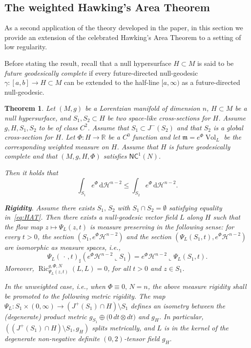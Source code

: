 \documentclass[12pt,a4paper]{amsart}
\theoremstyle{plain}
\newtheorem{theorem}[lemma]{Theorem}
\theoremstyle{definition}
\numberwithin{equation}{section}
\newcommand{\R}{\mathbb{R}}
\DeclareMathOperator{\Ric}{Ric}
\DeclareMathOperator{\vol}{Vol}
\newcommand{\de}{{\mathrm{d}}}
\newcommand{\NC}{\mathsf{NC}}
\newcommand{\haus}{\mathcal{H}}
\newcommand{\dotargument}{\,\cdot\,}
\newcommand{\mm}{\mathfrak m}
\begin{document}
\subsection{The weighted Hawking's Area Theorem}
\label{SS:WHAT}

As a second application of the theory
developed in the paper, in this section we provide an extension of  the celebrated Hawking's Area Theorem to a setting of low regularity.



Before stating the result, recall that a null hypersurface $H\subset M$ is said to be \emph{future geodesically complete} if every future-directed null-geodesic $\gamma:[a,b]\to H\subset M$ can be extended to the half-line $[a,\infty)$ as a future-directed null-geodesic.


\begin{theorem}\label{Thm:WHAT}
Let $(M,g)$ be a Lorentzian manifold of dimension $n$,
$H\subset M$ be a null hypersurface, and  $S_1,S_2\subset H$ be two space-like cross-sections for $H$. Assume $g, H, S_1, S_2$ to be of class $C^2$. Assume that $S_1\subset J^{-}(S_2)$ and that $S_2$ is a global
  cross-section for $H$.
Let $\Phi: H\to \R$ be a $C^0$ function and let $\mm=e^{\Phi} \vol_L$ be the corresponding weighted measure on $H$.
  Assume that $H$ is future geodesically complete and that  $(M,g,H, \Phi)$ satisfies
  $\NC^1(N)$. 
  
  Then it holds that
  \begin{equation}\label{eq:HAT}
    \int_{S_{1}}
    e^{\Phi}
    \,
    \de \haus^{n-2}
    \leq
    \int_{S_{2}}
    e^{\Phi}
    \,
    \de \haus^{n-2}
    .
  \end{equation}


\textbf{Rigidity}. Assume there exists $S_1,\,S_2$ with $S_1\cap S_2=\emptyset$ satisfying equality in~\eqref{eq:HAT}. Then there exists a null-geodesic vector field $L$ along $H$ such that the flow map $z\mapsto \Psi_{L}(z, t)$ is measure preserving in the following sense: for every $t>0$, the section $(S_1, e^{\Phi}\haus^{n-2})$ and the section $(\Psi_L(S_1, t), e^{\Phi}\haus^{n-2})$ are isomorphic as measure spaces, i.e., 
$$\Psi_L(\dotargument, t)_\sharp(e^{\Phi}\haus^{n-2}\llcorner S_1)= e^{\Phi}\haus^{n-2}\llcorner \Psi_L(S_1, t).$$ 
Moreover, $\Ric^{g,\Phi,N}_{\Psi_L(z,t)}(L,L) = 0$, for all $t>0$ and $z\in S_1$.


In the \emph{unweighted} case, i.e., when $\Phi\equiv 0, \, N=n$, the above measure rigidity shall be promoted to the following metric rigidity. The map $\Psi_L:S_1\times (0,\infty)\to (J^+(S_1)\cap H)\setminus S_1$ defines an isometry between the (degenerate) product  metric $g_{S_1}\oplus \big( 0 \, dt\otimes dt \big)$ and $g_H$. In particular, $((J^+(S_1)\cap H)\setminus S_1, g_H)$ splits metrically, and $L$ is in the kernel of the degenerate non-negative definite  $(0,2)$-tensor field $g_H$.
\end{theorem}
\end{document}
